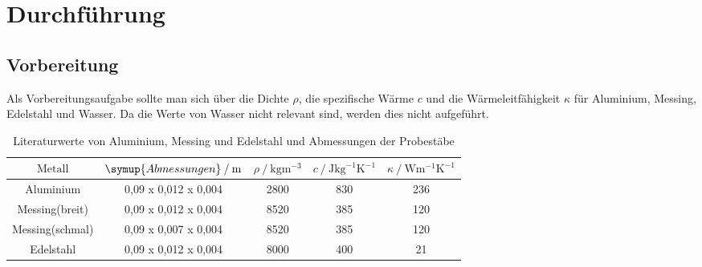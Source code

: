 \section{Durchführung}
\label{sec:Durchführung}
\subsection{Vorbereitung}
Als Vorbereitungsaufgabe sollte man sich über die Dichte $\rho$, die spezifische Wärme $c$ und die Wärmeleitfähigkeit $\kappa$ für 
Aluminium, Messing, Edelstahl und Wasser. Da die Werte von Wasser nicht relevant sind, werden dies nicht aufgeführt.
\begin{table}
    \centering
    \caption{Literaturwerte von Aluminium, Messing und Edelstahl und Abmessungen der Probestäbe}
    \label{tab:litwerte}
    \begin{tabular}{c c c c c}
        \toprule
        $\text{Metall}$ & $\symup{Abmessungen} \mathbin{/} \si{\meter}$ &$\rho \mathbin{/} \si{\kilogram\meter\tothe{-3}}$ 
        & $c \mathbin{/} \si{\joule\kilogram\tothe{-1}\kelvin\tothe{-1}}$ & $\kappa \mathbin{/} \si{\watt\meter\tothe{-1}\kelvin\tothe{-1}}$\\
        \midrule
        Aluminium & 0,09 x 0,012 x 0,004 & 2800 & 830 & 236 \\
        Messing(breit)   &  0,09 x 0,012 x 0,004 &8520 & 385 & 120 \\
        Messing(schmal)   & 0,09 x 0,007 x 0,004 &8520 & 385 & 120 \\
        Edelstahl &0,09 x 0,012 x 0,004  &8000 & 400 & 21  \\
      
        \bottomrule
    \end{tabular}
\end{table}
